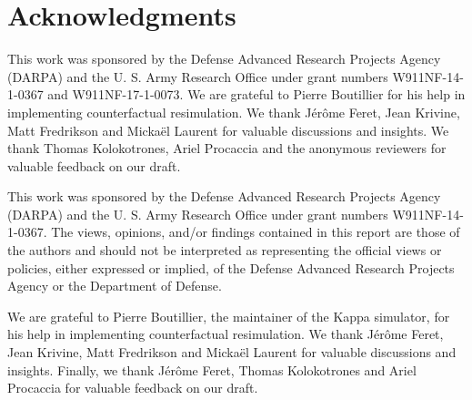 \section*{Acknowledgments}

\ifshort
This work was sponsored by the Defense Advanced Research Projects
Agency (DARPA) and the U. S. Army Research Office under grant numbers
W911NF-14-1-0367 and W911NF-17-1-0073.
We are grateful to Pierre Boutillier for his help in implementing
counterfactual resimulation. We thank J\'{e}r\^{o}me Feret, Jean
Krivine, Matt Fredrikson and Micka\"{e}l Laurent for valuable
discussions and insights. We thank Thomas Kolokotrones, Ariel
Procaccia and the anonymous reviewers for valuable feedback on our
draft.

\else

This work was sponsored by the Defense Advanced Research Projects
Agency (DARPA) and the U. S. Army Research Office under grant numbers
W911NF-14-1-0367.  The views, opinions, and/or findings
contained in this report are those of the authors and should not be
interpreted as representing the official views or policies, either
expressed or implied, of the Defense Advanced Research Projects Agency
or the Department of Defense. 

We are grateful to Pierre Boutillier, the maintainer of the Kappa
simulator, for his help in implementing counterfactual resimulation.
We thank J\'{e}r\^{o}me Feret, Jean Krivine, Matt Fredrikson and
Micka\"{e}l Laurent for valuable discussions and insights.  Finally,
we thank J\'{e}r\^{o}me Feret, Thomas Kolokotrones and Ariel Procaccia
for valuable feedback on our draft.
\fi
